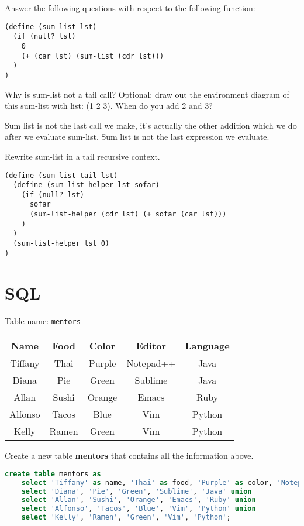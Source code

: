 \documentclass{exam}
\begin{document}
\begin{questions}
\begin{blocksection}
Answer the following questions with respect to the following function:
\begin{lstlisting}
(define (sum-list lst)
  (if (null? lst)
    0
    (+ (car lst) (sum-list (cdr lst)))
  )
)
\end{lstlisting}
\question Why is sum-list not a tail call? Optional: draw out the environment diagram of this sum-list with list: (1 2 3). When do you add 2 and 3?
\begin{solution}[0.5in]
Sum list is not the last call we make, it’s actually the other addition which we do after we evaluate sum-list. Sum list is not the last expression we evaluate.
\end{solution}
\question Rewrite sum-list in a tail recursive context.
\begin{solution}[0.5in]
\begin{lstlisting}
(define (sum-list-tail lst)
  (define (sum-list-helper lst sofar)
    (if (null? lst)
      sofar
      (sum-list-helper (cdr lst) (+ sofar (car lst)))
    )
  )
  (sum-list-helper lst 0)
)
\end{lstlisting}
\end{solution}
\end{blocksection}

\section{SQL}
\begin{blocksection}
Table name: \texttt{mentors}
\begin{center}
\begin{tabular}{ |c|c|c|c|c| }
 \hline
 \textbf{Name} & \textbf{Food} & \textbf{Color} & \textbf{Editor} & \textbf{Language} \\
 \hline
 Tiffany & Thai & Purple & Notepad++ & Java \\
 \hline
 Diana & Pie & Green & Sublime & Java \\
 \hline
  Allan & Sushi & Orange & Emacs & Ruby \\
 \hline
 Alfonso & Tacos & Blue & Vim & Python \\
 \hline
 Kelly & Ramen & Green & Vim & Python \\
 \hline
\end{tabular}
\end{center}
\question Create a new table \textbf{mentors} that contains all the information above.
\begin{solution}[1in]
\begin{lstlisting}[language=SQL]
create table mentors as
    select 'Tiffany' as name, 'Thai' as food, 'Purple' as color, 'Notepad++' as editor, 'Java' as language union
    select 'Diana', 'Pie', 'Green', 'Sublime', 'Java' union
    select 'Allan', 'Sushi', 'Orange', 'Emacs', 'Ruby' union
    select 'Alfonso', 'Tacos', 'Blue', 'Vim', 'Python' union
    select 'Kelly', 'Ramen', 'Green', 'Vim', 'Python';
\end{lstlisting}
\end{solution}
\end{blocksection}


\end{questions}
\end{document}
